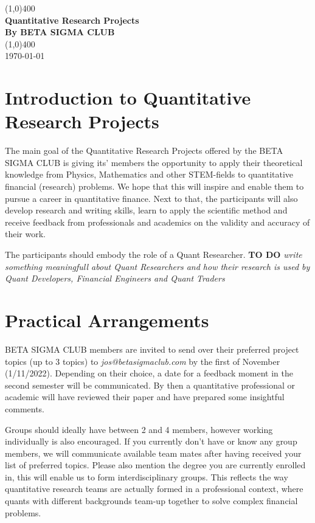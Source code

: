 \documentclass[11pt]{article}
\begin{document}
\begin{titlepage}
\begin{center}
\vspace*{1cm}
\vfill
\line(1,0){400}\\[1mm]
\huge{\textbf{Quantitative Research Projects}}\\[3mm]
\Large{\textbf{By BETA SIGMA CLUB}}\\[1mm]
\line(1,0){400}\\[3mm]
\vfill
\today

\end{center}
\end{titlepage}

\section{Introduction to Quantitative Research Projects}
The main goal of the Quantitative Research Projects offered by the BETA SIGMA CLUB is giving its' members the opportunity to apply their theoretical knowledge from Physics, Mathematics and other STEM-fields to quantitative financial (research) problems. We hope that this will inspire and enable them to pursue a career in quantitative finance. Next to that, the participants will also develop research and writing skills, learn to apply the scientific method and receive feedback from professionals and academics on the validity and accuracy of their work. 

The participants should embody the role of a Quant Researcher. \textbf{TO DO} \textit{write something meaningfull about Quant Researchers and how their research is used by Quant Developers, Financial Engineers and Quant Traders} 

\section{Practical Arrangements}
BETA SIGMA CLUB members are invited to send over their preferred project topics (up to 3 topics) to \textit{jos@betasigmaclub.com} by the first of November (1/11/2022). Depending on their choice, a date for a feedback moment in the second semester will be communicated. By then a quantitative professional or academic will have reviewed their paper and have prepared some insightful comments. 

Groups should ideally have between 2 and 4 members, however working individually is also encouraged. If you currently don't have or know any group members, we will communicate available team mates after having received your list of preferred topics. Please also mention the degree you are currently enrolled in, this will enable us to form interdisciplinary groups. This reflects the way quantitative research teams are actually formed in a professional context, where quants with different backgrounds team-up together to solve complex financial problems. 
\end{document}

